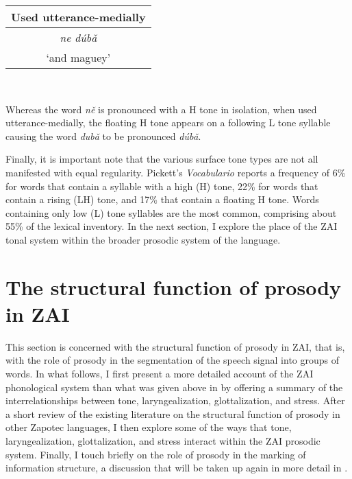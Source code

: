 \begin{table}
\begin{center}
\begin{tabular}{| c |}\hline
Used utterance-medially \\
\hline
\textit{n{e}}  \textit{d\'{u}b\v{a}} \\
`and maguey' \\
\hline
\end{tabular} \\
\end{center}
\end{table}

Whereas the word \textit{n\v{e}} is pronounced with a H tone in isolation, when used utterance-medially, the floating H tone appears on a following L tone syllable causing the word \textit{dub\v{a}} to be pronounced \textit{d\'{u}b\v{a}}.

Finally, it is important note that the various surface tone types are not all manifested with equal regularity. Pickett's \textit{Vocabulario} reports a frequency of 6\% for words that contain a syllable with a high (H) tone, 22\% for words that contain a rising (LH) tone, and 17\% that contain a floating H tone. Words containing only low (L) tone syllables are the most common, comprising about 55\% of the lexical inventory. In the next section, I explore the place of the ZAI tonal system within the broader prosodic system of the language.


\section{The structural function of prosody in ZAI}\label{prosody}

This section is concerned with the structural function of prosody in ZAI, that is, with the role of prosody in the segmentation of the speech signal into groups of words. In what follows, I first present a more detailed account of the ZAI phonological system than what was given above in  by offering a summary of the interrelationships between tone, laryngealization, glottalization, and stress. After a short review of the existing literature on the structural function of prosody in other Zapotec languages, I then explore some of the ways that tone, laryngealization, glottalization, and stress interact within the ZAI prosodic system. Finally, I touch briefly on the role of prosody in the marking of information structure, a discussion that will be taken up again in more detail in .



